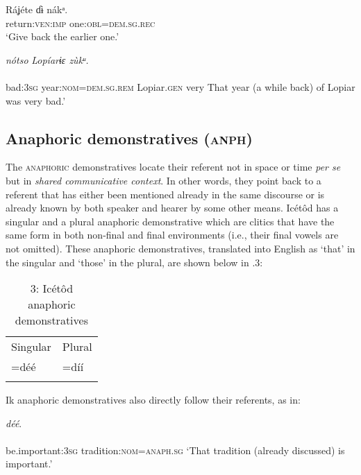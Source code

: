 \ea\label{ex:}
\gll Ráʝéte     ɗɨ nákᵃ.\\
return:\textsc{ven:imp}   one:\textsc{obl=dem.sg.rec}\\
\glt ‘Give back the earlier one.’ 
\z




\ea\label{ex:}
 \textit{nótso}\textit{       Lopíarɨɛ     zùkᵘ.} \\
    \\
bad:\textsc{3sg}   year:\textsc{nom}=\textsc{dem.sg.rem}   Lopiar.\textsc{gen} very
\glt That year (a while back) of Lopiar was very bad.’
\z  





\subsection{Anaphoric demonstratives (\textsc{anph})}


The \textsc{anaphoric} demonstratives locate their referent not in space or time \textit{per se} but in \textit{shared communicative context}. In other words, they point back to a referent that has either been mentioned already in the same discourse or is already known by both speaker and hearer by some other means. Icétôd has a singular and a plural anaphoric demonstrative which are clitics that have the same form in both non-final and final environments (i.e., their final vowels are not omitted). These anaphoric demonstratives, translated into English as ‘that’ in the singular and ‘those’ in the plural, are shown below in .3:


\begin{table}
\caption{3: Icétôd anaphoric demonstratives}
\label{tab:6}


\begin{tabularx}{\textwidth}{XX}
\lsptoprule

Singular & Plural\\
=déé & =díí\\
\lspbottomrule
\end{tabularx}
\end{table}
Ik anaphoric demonstratives also directly follow their referents, as in:




\ea\label{ex:}
 \textit{déé}. \\
    \\
be.important:\textsc{3sg}   tradition:\textsc{nom}=\textsc{anaph.sg}
\glt ‘That tradition (already discussed) is important.’ 
\z





